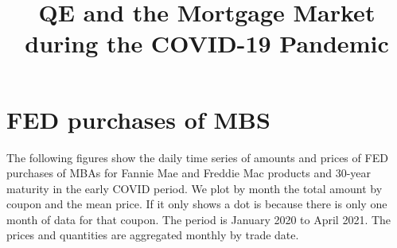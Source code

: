 \documentclass[11pt,a4paper]{article}
\begin{document}
\title{QE and the Mortgage Market during the COVID-19 Pandemic}

\maketitle



\section{FED purchases of MBS}

The following figures show the daily time series of amounts and prices of FED purchases of MBAs for Fannie Mae and Freddie Mac
 products and 30-year maturity in the early COVID period. We plot by month the total amount by coupon and the mean price. If it only shows a dot is because there is only one month of data for that coupon. The period is January 2020 to April 2021. The prices and quantities are aggregated monthly by trade date. 
\end{document}
